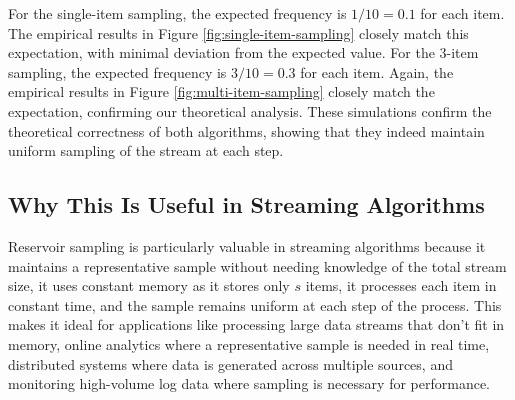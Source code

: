 \documentclass{article}
\begin{document}
For the single-item sampling, the expected frequency is $1/10 = 0.1$ for each item. The empirical results in Figure \ref{fig:single-item-sampling} closely match this expectation, with minimal deviation from the expected value. For the 3-item sampling, the expected frequency is $3/10 = 0.3$ for each item. Again, the empirical results in Figure \ref{fig:multi-item-sampling} closely match the expectation, confirming our theoretical analysis. These simulations confirm the theoretical correctness of both algorithms, showing that they indeed maintain uniform sampling of the stream at each step.

\subsection{Why This Is Useful in Streaming Algorithms}

Reservoir sampling is particularly valuable in streaming algorithms because it maintains a representative sample without needing knowledge of the total stream size, it uses constant memory as it stores only $s$ items, it processes each item in constant time, and the sample remains uniform at each step of the process. This makes it ideal for applications like processing large data streams that don't fit in memory, online analytics where a representative sample is needed in real time, distributed systems where data is generated across multiple sources, and monitoring high-volume log data where sampling is necessary for performance.
\end{document}

